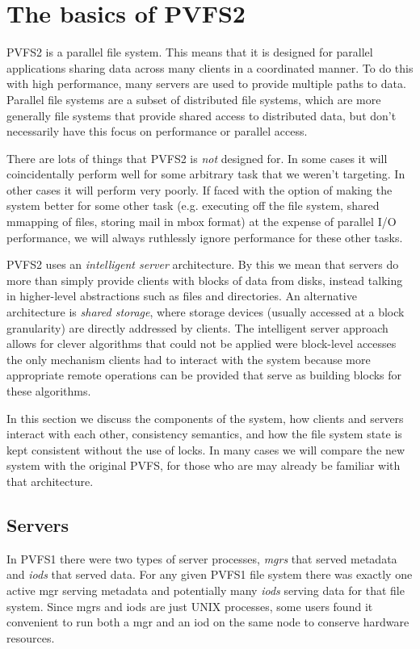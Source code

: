\section{The basics of PVFS2}

PVFS2 is a parallel file system.  This means that it is designed for parallel
applications sharing data across many clients in a coordinated manner.  To do
this with high performance, many servers are used to provide multiple paths to
data.  Parallel file systems are a subset of distributed file systems, which
are more generally file systems that provide shared access to distributed
data, but don't necessarily have this focus on performance or parallel access.

There are lots of things that PVFS2 is \emph{not} designed for.  In some cases
it will coincidentally perform well for some arbitrary task that we weren't
targeting.  In other cases it will perform very poorly.  If faced with the
option of making the system better for some other task (e.g. executing off
the file system, shared mmapping of files, storing mail in mbox format) at the
expense of parallel I/O performance, we will always ruthlessly ignore
performance for these other tasks.

PVFS2 uses an \emph{intelligent server} architecture.  By this we mean that
servers do more than simply provide clients with blocks of data from disks,
instead talking in higher-level abstractions such as files and directories.
An alternative architecture is \emph{shared storage}, where storage devices
(usually accessed at a block granularity) are directly addressed by clients.
The intelligent server approach allows for clever algorithms that could not be
applied were block-level accesses the only mechanism clients had to interact
with the system because more appropriate remote operations can be provided
that serve as building blocks for these algorithms.

In this section we discuss the components of the system, how clients and
servers interact with each other, consistency semantics, and how the file
system state is kept consistent without the use of locks.  In many cases we
will compare the new system with the original PVFS, for those who are may
already be familiar with that architecture.

\subsection{Servers}

In PVFS1 there were two types of server processes, \emph{mgrs} that served
metadata and \emph{iods} that served data.  For any given PVFS1 file system
there was exactly one active mgr serving metadata and potentially many
\emph{iods} serving data for that file system.  Since mgrs and iods are just
UNIX processes, some users found it convenient to run both a mgr and an iod on
the same node to conserve hardware resources.

